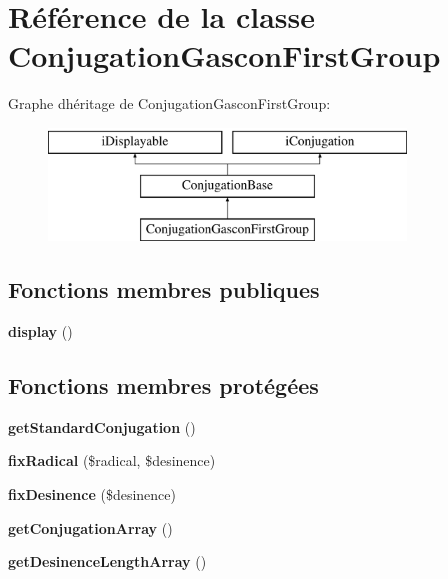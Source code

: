 \hypertarget{classConjugationGasconFirstGroup}{}\section{Référence de la classe Conjugation\+Gascon\+First\+Group}
\label{classConjugationGasconFirstGroup}
Graphe d\textquotesingle{}héritage de Conjugation\+Gascon\+First\+Group\+:\begin{figure}[H]
\begin{center}
\leavevmode
\includegraphics[height=3.000000cm]{classConjugationGasconFirstGroup}
\end{center}
\end{figure}
\subsection*{Fonctions membres publiques}
\begin{DoxyCompactItemize}
\item 
\hypertarget{classConjugationGasconFirstGroup_ace1bf96e8316a91e65e88f5e1e48c334}{}\label{classConjugationGasconFirstGroup_ace1bf96e8316a91e65e88f5e1e48c334} 
{\bfseries display} ()
\end{DoxyCompactItemize}
\subsection*{Fonctions membres protégées}
\begin{DoxyCompactItemize}
\item 
\hypertarget{classConjugationGasconFirstGroup_a60ac1ed66054150563ec6f8812861c4a}{}\label{classConjugationGasconFirstGroup_a60ac1ed66054150563ec6f8812861c4a} 
{\bfseries get\+Standard\+Conjugation} ()
\item 
\hypertarget{classConjugationGasconFirstGroup_ae03c569a6c3064a38d1eabeac9baf317}{}\label{classConjugationGasconFirstGroup_ae03c569a6c3064a38d1eabeac9baf317} 
{\bfseries fix\+Radical} (\$radical, \$desinence)
\item 
\hypertarget{classConjugationGasconFirstGroup_ad77d7a335be2cfd931aac7d90718c231}{}\label{classConjugationGasconFirstGroup_ad77d7a335be2cfd931aac7d90718c231} 
{\bfseries fix\+Desinence} (\$desinence)
\item 
\hypertarget{classConjugationGasconFirstGroup_a982308fd578abc51d30b667d5099d0c2}{}\label{classConjugationGasconFirstGroup_a982308fd578abc51d30b667d5099d0c2} 
{\bfseries get\+Conjugation\+Array} ()
\item 
\hypertarget{classConjugationGasconFirstGroup_a03a995eb9d13945f5746bf20d45c4d7f}{}\label{classConjugationGasconFirstGroup_a03a995eb9d13945f5746bf20d45c4d7f} 
{\bfseries get\+Desinence\+Length\+Array} ()
\end{DoxyCompactItemize}
